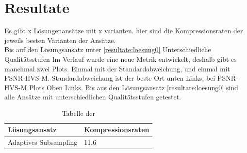 \section{Resultate}\label{resultate}
Es gibt x Lösungenansätze mit x varianten.  hier sind die Kompressionsraten der jeweils besten Varianten der Ansätze.\\
Bis auf den Lösungsansatz unter \ref{resultate:loesung0} Unterschiedliche Qualitätsstufen
Im Verlauf wurde eine neue Metrik entwickelt, deshalb gibt es manchmal zwei Plots. Einmal mit der Standardabweichung, und einmal mit PSNR-HVS-M. Standardabweichung ist der beste Ort unten Links, bei PSNR-HVS-M Plots Oben Links. Bis aus den Lösungsansatz \ref{resultate:loesung0} sind alle Ansätze mit unterschiedlichen Qualitätsstufen getestet.
\begin{table}
	\center
	\begin{tabular}{l|l}
		Lösungsansatz & Kompressionsraten \\\hline
		Adaptives Subsampling & 11.6 \\
			
	\end{tabular}
	\caption{Tabelle der }
\end{table}

